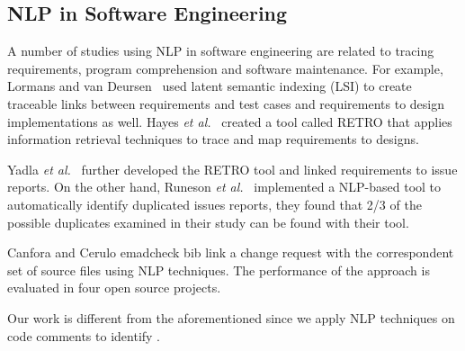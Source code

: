 \subsection{NLP in Software Engineering}

A number of studies using NLP in software engineering are related to tracing requirements, program comprehension and software maintenance. 
For example, Lormans and van Deursen~\cite{Lormans2006CSRM} used latent semantic indexing (LSI) to create traceable links between requirements and test cases and requirements to design implementations as well. Hayes \textit{et al.}~\cite{Hayes2005, Hayes2006TSE} created a tool called RETRO that applies information retrieval techniques to trace and map requirements to designs. 

Yadla \textit{et al.}~\cite{yadla2005tracing} further developed the RETRO tool and linked requirements to issue reports. On the other hand, Runeson \textit{et al.}~\cite{Runeson2007ICSE} implemented a NLP-based tool to automatically identify duplicated issues reports, they found that 2/3 of the possible duplicates examined in their study can be found with their tool. 

Canfora and Cerulo \cite{Canfora2005ISSM} emad{check bib} link a change request with the correspondent set of source files using NLP techniques. The performance of the approach is evaluated in four open source projects.  

Our work is different from the aforementioned since we apply NLP techniques on code comments to identify \SATD.